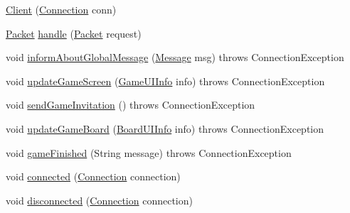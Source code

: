 \begin{DoxyCompactItemize}
\item 
\hyperlink{classpt_1_1up_1_1fe_1_1lpro1613_1_1server_1_1conn_1_1_client_a057095008df340effc95b69dbda5b643}{Client} (\hyperlink{classpt_1_1up_1_1fe_1_1lpro1613_1_1sharedlib_1_1conn_1_1_connection}{Connection} conn)
\item 
\hyperlink{classpt_1_1up_1_1fe_1_1lpro1613_1_1sharedlib_1_1conn_1_1_packet}{Packet} \hyperlink{classpt_1_1up_1_1fe_1_1lpro1613_1_1server_1_1conn_1_1_client_a81efbd1e6b06189da5c814ac767a4a98}{handle} (\hyperlink{classpt_1_1up_1_1fe_1_1lpro1613_1_1sharedlib_1_1conn_1_1_packet}{Packet} request)
\item 
void \hyperlink{classpt_1_1up_1_1fe_1_1lpro1613_1_1server_1_1conn_1_1_client_aea2e952268afe16993958c8affb921cb}{inform\+About\+Global\+Message} (\hyperlink{classpt_1_1up_1_1fe_1_1lpro1613_1_1sharedlib_1_1tuples_1_1_message}{Message} msg)  throws Connection\+Exception 
\item 
void \hyperlink{classpt_1_1up_1_1fe_1_1lpro1613_1_1server_1_1conn_1_1_client_ad3cc8b10b942f6260a0e7db7f5a0a538}{update\+Game\+Screen} (\hyperlink{classpt_1_1up_1_1fe_1_1lpro1613_1_1sharedlib_1_1tuples_1_1_game_u_i_info}{Game\+U\+I\+Info} info)  throws Connection\+Exception 
\item 
void \hyperlink{classpt_1_1up_1_1fe_1_1lpro1613_1_1server_1_1conn_1_1_client_a2d18ebb9809e36b016e9db24c8274522}{send\+Game\+Invitation} ()  throws Connection\+Exception 
\item 
void \hyperlink{classpt_1_1up_1_1fe_1_1lpro1613_1_1server_1_1conn_1_1_client_a68fc46855fd613c9ca06c32da08c2f5a}{update\+Game\+Board} (\hyperlink{classpt_1_1up_1_1fe_1_1lpro1613_1_1sharedlib_1_1tuples_1_1_board_u_i_info}{Board\+U\+I\+Info} info)  throws Connection\+Exception 
\item 
void \hyperlink{classpt_1_1up_1_1fe_1_1lpro1613_1_1server_1_1conn_1_1_client_a58789376953d4b6f316a48627dffbae1}{game\+Finished} (String message)  throws Connection\+Exception 
\item 
void \hyperlink{classpt_1_1up_1_1fe_1_1lpro1613_1_1server_1_1conn_1_1_client_a1cf160e68d7310d9f0b3a53d8b26f80d}{connected} (\hyperlink{classpt_1_1up_1_1fe_1_1lpro1613_1_1sharedlib_1_1conn_1_1_connection}{Connection} connection)
\item 
void \hyperlink{classpt_1_1up_1_1fe_1_1lpro1613_1_1server_1_1conn_1_1_client_a8aaec34bb1c5d5af0430318b105ac3fc}{disconnected} (\hyperlink{classpt_1_1up_1_1fe_1_1lpro1613_1_1sharedlib_1_1conn_1_1_connection}{Connection} connection)
\end{DoxyCompactItemize}


